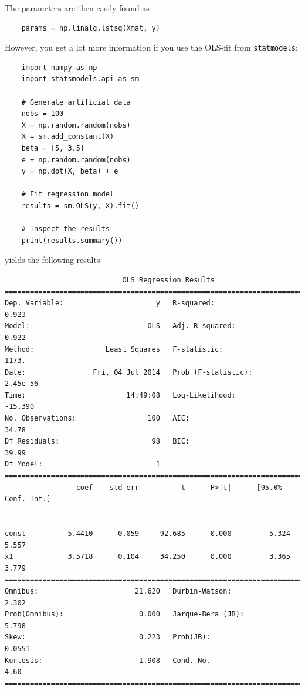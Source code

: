 The parameters are then easily found as

\begin{lstlisting}
    params = np.linalg.lstsq(Xmat, y)
\end{lstlisting}

However, you get a lot more information if you use the OLS-fit from \lstinline{statmodels}:

\begin{lstlisting}
    import numpy as np
    import statsmodels.api as sm

    # Generate artificial data
    nobs = 100
    X = np.random.random(nobs)
    X = sm.add_constant(X)
    beta = [5, 3.5]
    e = np.random.random(nobs)
    y = np.dot(X, beta) + e

    # Fit regression model
    results = sm.OLS(y, X).fit()

    # Inspect the results
    print(results.summary())
\end{lstlisting}

yields the following results:

\begin{lstlisting}
                            OLS Regression Results
==============================================================================
Dep. Variable:                      y   R-squared:                       0.923
Model:                            OLS   Adj. R-squared:                  0.922
Method:                 Least Squares   F-statistic:                     1173.
Date:                Fri, 04 Jul 2014   Prob (F-statistic):           2.45e-56
Time:                        14:49:08   Log-Likelihood:                -15.390
No. Observations:                 100   AIC:                             34.78
Df Residuals:                      98   BIC:                             39.99
Df Model:                           1
==============================================================================
                 coef    std err          t      P>|t|      [95.0% Conf. Int.]
------------------------------------------------------------------------------
const          5.4410      0.059     92.685      0.000         5.324     5.557
x1             3.5718      0.104     34.250      0.000         3.365     3.779
==============================================================================
Omnibus:                       21.620   Durbin-Watson:                   2.302
Prob(Omnibus):                  0.000   Jarque-Bera (JB):                5.798
Skew:                           0.223   Prob(JB):                       0.0551
Kurtosis:                       1.908   Cond. No.                         4.60
==============================================================================
\end{lstlisting}

